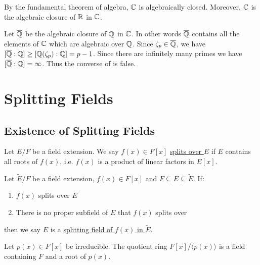 \documentclass[11pt]{article}
\begin{document}
\begin{example}
    By the fundamental theorem of algebra, $\mathbb{C}$ is algebraically closed. Moreover, $\mathbb{C}$ is the algebraic closure of $\mathbb{R}$ in $\mathbb{C}$.
\end{example}

\begin{example}
    Let $\overline{\mathbb{Q}}$ be the algebraic closure of $\mathbb{Q}$ in $\mathbb{C}$. In other words $\overline{\mathbb{Q}}$ contains all the elements of $\mathbb{C}$ which are algebraic over $\mathbb{Q}$. Since $\zeta_p\in\overline{\mathbb{Q}}$, we have $[\overline{\mathbb{Q}}:\mathbb{Q}]\geq[\mathbb{Q}(\zeta_p):\mathbb{Q}]=p-1$. Since there are infinitely many primes we have $[\overline{\mathbb{Q}}:\mathbb{Q}]=\infty$. Thus the converse of  is false.
\end{example}

\pagebreak

\section{Splitting Fields}

\subsection{Existence of Splitting Fields}

\begin{definition}
    Let $E/F$ be a field extension. We say $f(x)\in F[x]$ \ul{splits over $E$} if $E$ contains all roots of $f(x)$, i.e. $f(x)$ is a product of linear factors in $E[x]$.
\end{definition}

\begin{definition}
    Let $\tilde{E}/F$ be a field extension, $f(x)\in F[x]$ and $F\subseteq E\subseteq\tilde{E}$. If:
    \begin{enumerate}
        \item $f(x)$ splits over $E$
        \item There is no proper subfield of $E$ that $f(x)$ splits over
    \end{enumerate}
    then we say $E$ is a \ul{splitting field of $f(x)$ in $\tilde{E}$}.
\end{definition}

\begin{theorem}
    Let $p(x)\in F[x]$ be irreducible. The quotient ring $F[x]/\langle p(x)\rangle$ is a field containing $F$ and a root of $p(x)$.
\end{theorem}
\end{document}
